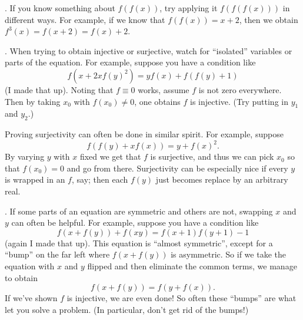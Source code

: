 \documentclass[11pt]{scrartcl}
\begin{document}
\begin{itemize}
  \ii {}.
  If you know something about $f(f(x))$,
  try applying it $f(f(f(x)))$ in different ways.
  For example, if we know that $f(f(x)) = x+2$,
  then we obtain $f^3(x) = f(x+2) = f(x)+2$.

  \ii {}.
  When trying to obtain injective or surjective,
  watch for ``isolated'' variables or parts of the equation.
  For example, suppose you have a condition like
  \[ f(x+2xf(y)^2) = yf(x) + f(f(y)+1) \]
  (I made that up).
  Noting that $f \equiv 0$ works, assume $f$ is not zero everywhere.
  Then by taking $x_0$ with $f(x_0) \neq 0$,
  one obtains $f$ is injective.
  (Try putting in $y_1$ and $y_2$.)

  Proving surjectivity can often be done in similar spirit.
  For example, suppose
  \[ f(f(y)+xf(x)) = y+f(x)^2. \]
  By varying $y$ with $x$ fixed we get that $f$ is surjective,
  and thus we can pick $x_0$ so that $f(x_0) = 0$
  and go from there.
  Surjectivity can be especially nice if every $y$
  is wrapped in an $f$, say; then each $f(y)$ just becomes
  replace by an arbitrary real.

  \ii {}.
  If some parts of an equation are symmetric and others are not,
  swapping $x$ and $y$ can often be helpful.
  For example, suppose you have a condition like
  \[ f(x+f(y)) + f(xy) = f(x+1)f(y+1) - 1 \]
  (again I made that up).
  This equation is ``almost symmetric'',
  except for a ``bump'' on the far left where $f(x+f(y))$ is asymmetric.
  So if we take the equation with $x$ and $y$ flipped
  and then eliminate the common terms,
  we manage to obtain \[ f(x+f(y)) = f(y+f(x)). \]
  If we've shown $f$ is injective, we are even done!
  So often these ``bumps'' are what let you solve a problem.
  (In particular, don't get rid of the bumps!)
\end{itemize}
\end{document}
